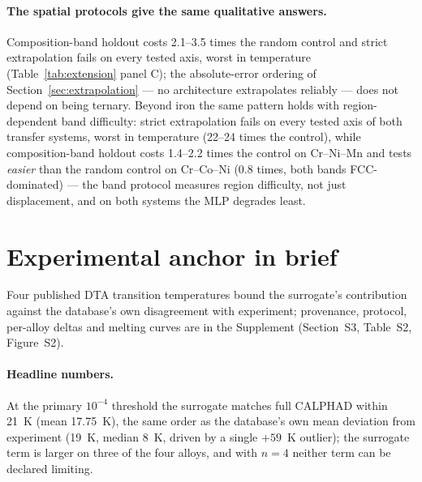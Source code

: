 \documentclass[preprint,12pt,authoryear]{elsarticle}
\begin{document}
\paragraph{The spatial protocols give the same qualitative answers.}
Composition-band holdout costs 2.1--3.5 times the random control and
strict extrapolation fails on every tested axis, worst in temperature
(Table~\ref{tab:extension} panel C); the absolute-error ordering of
Section~\ref{sec:extrapolation} --- no architecture extrapolates
reliably --- does not depend on being ternary. Beyond iron the same
pattern holds with region-dependent band difficulty: strict
extrapolation fails on every tested axis of both transfer systems, worst
in temperature (22--24 times the control), while composition-band
holdout costs 1.4--2.2 times the control on Cr--Ni--Mn and tests
\emph{easier} than the random control on Cr--Co--Ni (0.8 times, both
bands FCC-dominated) --- the band protocol measures region difficulty,
not just displacement, and on both systems the MLP degrades least.

\begin{table}[htbp]
\centering
\caption{Scope-extension systems. (A) System and dataset statistics. (B)
Test MAE (mean over three seeds; uncertainty in units of the last digit),
best per system in bold. (C) Contiguous-band and strict-extrapolation
holdouts against size-matched random controls (penalty ratios in the
penalty rows). (D) Phase-set validation against the full eligible set.}
\label{tab:extension}
\small

\end{table}

\section{Experimental anchor in brief}
\label{sec:anchor}

Four published DTA transition temperatures bound the surrogate's
contribution against the database's own disagreement with experiment;
provenance, protocol, per-alloy deltas and melting curves are in the
Supplement (Section~S3, Table~S2, Figure~S2).

\paragraph{Headline numbers.}
At the primary $10^{-4}$ threshold the surrogate matches full CALPHAD
within 21~K (mean 17.75~K), the same order as the database's own mean
deviation from experiment (19~K, median 8~K, driven by a single $+59$~K
outlier); the surrogate term is larger on three of the four alloys, and
with $n = 4$ neither term can be declared limiting.
\end{document}
